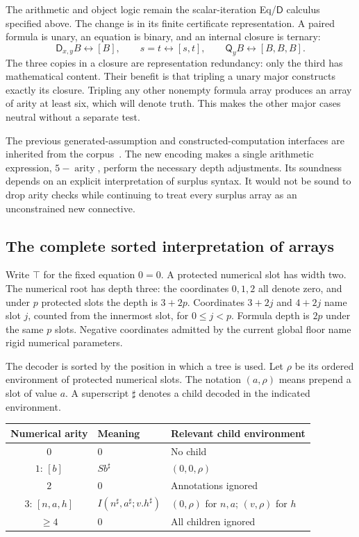 \documentclass[11pt,letterpaper]{article}
\theoremstyle{definition}
\theoremstyle{remark}
\newcommand{\D}{\mathsf D}
\newcommand{\Q}{\mathsf Q}
\begin{document}
The arithmetic and object logic remain the scalar-iteration Eq/$\D$
calculus specified above.  The change is in its finite certificate
representation.  A paired formula is unary, an equation is binary, and
an internal closure is ternary:
\[
 \D_{x,y}B\longleftrightarrow[B],\qquad
 s=t\longleftrightarrow[s,t],\qquad
 \Q_yB\longleftrightarrow[B,B,B].
 \tag{Arity encoding}\label{eq:arity-encoding}
\]
The three copies in a closure are representation redundancy: only the
third has mathematical content.  Their benefit is that tripling a unary
major constructs exactly its closure.  Tripling any other nonempty
formula array produces an array of arity at least six, which will denote
truth.  This makes the other major cases neutral without a separate
test.

The previous generated-assumption and constructed-computation interfaces
are inherited from the corpus~\cite{generated,constructed}.  The new
encoding makes a single arithmetic expression, $5-\operatorname{arity}$,
perform the necessary depth adjustments.  Its soundness depends on an
explicit interpretation of surplus syntax.  It would not be sound to
drop arity checks while continuing to treat every surplus array as an
unconstrained new connective.

\subsection{The complete sorted interpretation of arrays}
\label{subsec:sorted-arrays}

Write $\top$ for the fixed equation $0=0$.  A protected numerical slot
has width two.  The numerical root has depth three: the coordinates
$0,1,2$ all denote zero, and under $p$ protected slots the depth is
$3+2p$.  Coordinates $3+2j$ and $4+2j$ name slot $j$, counted from
the innermost slot, for $0\leq j<p$.  Formula depth is $2p$ under the
same $p$ slots.  Negative coordinates admitted by the current global
floor name rigid numerical parameters.

The decoder is sorted by the position in which a tree is used.  Let
$\rho$ be its ordered environment of protected numerical slots.
The notation $(a,\rho)$ means prepend a slot of value $a$.
A superscript $\sharp$ denotes a child decoded in the indicated
environment.

\begin{center}
\begin{tabular}{cll}
\toprule
Numerical arity & Meaning & Relevant child environment\\
\midrule
$0$ & $0$ & No child\\
$1$: $[b]$ & $Sb^\sharp$ & $(0,0,\rho)$\\
$2$ & $0$ & Annotations ignored\\
$3$: $[n,a,h]$ & $I(n^\sharp,a^\sharp;v.h^\sharp)$ & $(0,\rho)$ for $n,a$; $(v,\rho)$ for $h$\\
$\geq4$ & $0$ & All children ignored\\
\bottomrule
\end{tabular}
\end{center}
\end{document}
